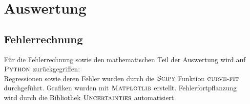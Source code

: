\documentclass[
  bibliography=totoc,     %
  captions=tableheading,  %
  titlepage=firstiscover, %
]{scrartcl}
\begin{document}
\section{Auswertung}
\label{sec:auswertung}
\subsection{Fehlerrechnung}
Für die Fehlerrechnung sowie den mathematischen Teil der Auswertung wird auf
$\textsc{Python}$ zurückgegriffen:\\
Regressionen sowie deren Fehler wurden durch die $\textsc{Scipy}$ \cite{scipy} Funktion
$\textsc{curve-fit}$ durchgeführt. Grafiken wurden mit $\textsc{Matplotlib}$ \cite{matplotlib}
erstellt.
Fehlerfortpflanzung wird durch die Bibliothek
$\textsc{Uncertainties}$ \cite{uncertainties} automatisiert.
\end{document}
